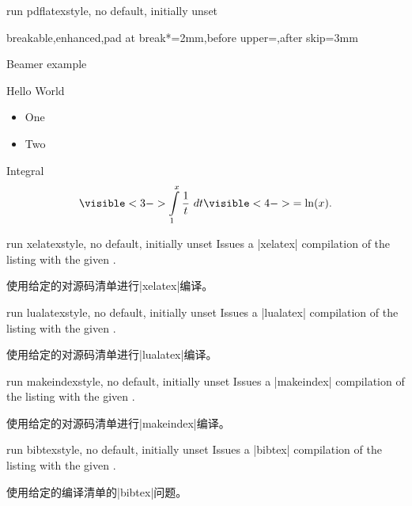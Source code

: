 \begin{docTcbKey}[][doc new=2014-11-14]{run pdflatex}{}{style, no default, initially unset}
\begin{dispListing*}{breakable,enhanced,pad at break*=2mm,before upper=,after skip=3mm}
\begin{tcblisting}
\begin{frame}{Beamer example}
\begin{block}{Hello World}
\begin{itemize}[<+->]
    \item One
    \item Two
\end{itemize}
\end{block}

\begin{alertblock}{Integral}
\begin{equation}
    \visible<3->{\int\limits_1^x \frac{1}{t}~dt}
    \visible<4->{ = \ln(x).}
\end{equation}
\end{alertblock}
\end{frame}

\end{tcblisting}
\end{dispListing*}
{\tcbusetemp}
\end{docTcbKey}


\begin{docTcbKey}[][doc new=2014-11-14]{run xelatex}{}{style, no default, initially unset}
Issues a |xelatex| compilation of the listing with the given .

使用给定的对源码清单进行|xelatex|编译。
\end{docTcbKey}

\begin{docTcbKey}[][doc new=2014-11-14]{run lualatex}{}{style, no default, initially unset}
Issues a |lualatex| compilation of the listing with the given .

使用给定的对源码清单进行|lualatex|编译。
\end{docTcbKey}

\begin{docTcbKey}[][doc new=2014-11-14]{run makeindex}{}{style, no default, initially unset}
Issues a |makeindex| compilation of the listing with the given .

使用给定的对源码清单进行|makeindex|编译。
\end{docTcbKey}

\begin{docTcbKey}[][doc new=2014-11-14]{run bibtex}{}{style, no default, initially unset}
Issues a |bibtex| compilation of the listing with the given .

使用给定的编译清单的|bibtex|问题。
\end{docTcbKey}

